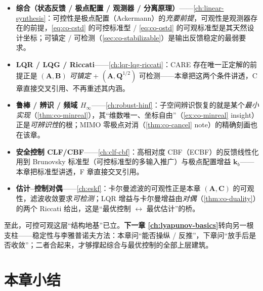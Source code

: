 \begin{itemize}
  \item \textbf{综合（状态反馈 / 极点配置 / 观测器 / 分离原理）}——\cref{ch:linear-synthesis}：可控性是极点配置（Ackermann）的\emph{充要前提}，可观性是观测器存在的前提，\cref{eq:co-cstd} 的可控标准型 / \cref{eq:co-ostd} 的可观标准型是其天然设计坐标；可镇定 / 可检测（\cref{sec:co-stabilizable}）是输出反馈稳定的最弱要求。
  \item \textbf{LQR / LQG / Riccati}——\cref{ch:lqr-lqg-riccati}：CARE 存在唯一正定解的前提正是 $(\mathbf{A},\mathbf{B})$ \emph{可镇定} + $(\mathbf{A},\mathbf{Q}^{1/2})$ 可检测——本章把这两个条件讲透，C 章直接交叉引用、不再重述其内涵。
  \item \textbf{鲁棒 / 辨识 / 频域 $H_\infty$}——\cref{ch:robust-hinf}：子空间辨识恢复的就是某个\emph{最小实现}（\cref{thm:co-minreal}），其“维数唯一、坐标自由”（\cref{ex:co-minreal} insight）正是\emph{可辨识性}的根；MIMO 零极点对消（\cref{thm:co-cancel} note）的精确刻画也在该章。
  \item \textbf{安全控制 CLF/CBF}——\cref{ch:clf-cbf}：高相对度 CBF（ECBF）的反馈线性化用到 Brunovsky 标准型（可控标准型的多输入推广）与极点配置增益 $\mathbf{k}_b$——本章把标准型讲透，F 章直接交叉引用。
  \item \textbf{估计--控制对偶}——\cref{ch:eskf}：卡尔曼滤波的可观性正是本章 $(\mathbf{A},\mathbf{C})$ 的可观性，滤波收敛要求\emph{可检测}；LQR 增益与卡尔曼增益由\emph{对偶}（\cref{thm:co-duality}）的两个 Riccati 给出，这是“最优控制 $\leftrightarrow$ 最优估计”的桥。
\end{itemize}

\noindent 至此，可控可观这层“结构地基”已立。\textbf{下一章 \cref{ch:lyapunov-basics}}转向另一根支柱——稳定性与李雅普诺夫方法：本章问“能否操纵 / 反推”，下章问“放手后是否收敛”；二者合起来，才够撑起综合与最优控制的全部上层建筑。

\section*{本章小结}

